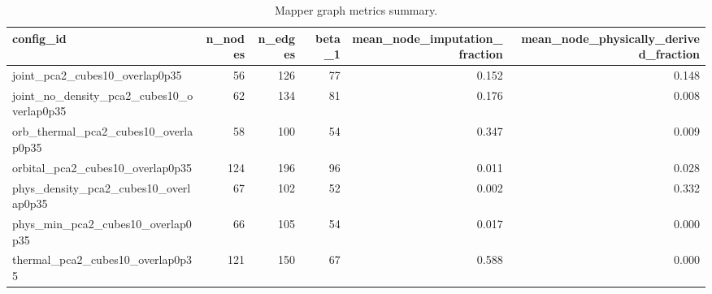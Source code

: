 \begin{table}[p]
\centering
\caption{Mapper graph metrics summary.}
\label{tab:mapper_graph_metrics_summary}
\begin{adjustbox}{max width=\linewidth}
\begin{tabular}{lrrrrr}
\toprule
config\_id & n\_nodes & n\_edges & beta\_1 & mean\_node\_imputation\_fraction & mean\_node\_physically\_derived\_fraction \\
\midrule
joint\_pca2\_cubes10\_overlap0p35 & 56 & 126 & 77 & 0.152 & 0.148 \\
joint\_no\_density\_pca2\_cubes10\_overlap0p35 & 62 & 134 & 81 & 0.176 & 0.008 \\
orb\_thermal\_pca2\_cubes10\_overlap0p35 & 58 & 100 & 54 & 0.347 & 0.009 \\
orbital\_pca2\_cubes10\_overlap0p35 & 124 & 196 & 96 & 0.011 & 0.028 \\
phys\_density\_pca2\_cubes10\_overlap0p35 & 67 & 102 & 52 & 0.002 & 0.332 \\
phys\_min\_pca2\_cubes10\_overlap0p35 & 66 & 105 & 54 & 0.017 & 0.000 \\
thermal\_pca2\_cubes10\_overlap0p35 & 121 & 150 & 67 & 0.588 & 0.000 \\
\bottomrule
\end{tabular}
\end{adjustbox}
\end{table}
